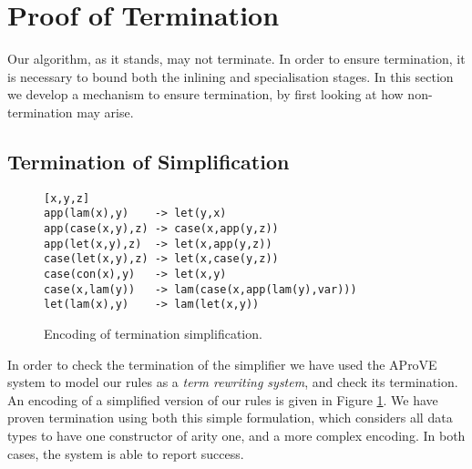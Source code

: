
\section{Proof of Termination}
\label{secF:termination}

\begin{comment}
We can remove all data types by encoding them as functions, as described in \citet{naylor:reduceron}. If we then had a transformation which made the program first-order \textit{without} introducing any data types, we would end up with a program without data or closures, which is incapable of storing an unbounded amount of information. Since with higher-order functions we can implement a Turing machine \cite{turing:halting}, and without an unbounded store we cannot, such a transformation cannot exist.
\end{comment}

Our algorithm, as it stands, may not terminate. In order to ensure termination, it is necessary to bound both the inlining and specialisation stages. In this section we develop a mechanism to ensure termination, by first looking at how non-termination may arise.

\subsection{Termination of Simplification}
\label{secF:termination_simplification}

\begin{figure}
\bigskip
\begin{verbatim}
[x,y,z]
app(lam(x),y)    -> let(y,x)
app(case(x,y),z) -> case(x,app(y,z))
app(let(x,y),z)  -> let(x,app(y,z))
case(let(x,y),z) -> let(x,case(y,z))
case(con(x),y)   -> let(x,y)
case(x,lam(y))   -> lam(case(x,app(lam(y),var)))
let(lam(x),y)    -> lam(let(x,y))
\end{verbatim}
\bigskip
\caption{Encoding of termination simplification.}
\label{figF:term_simplification}
\end{figure}

In order to check the termination of the simplifier we have used the AProVE system \cite{aprove} to model our rules as a \textit{term rewriting system}, and check its termination. An encoding of a simplified version of our rules is given in Figure \ref{figF:term_simplification}. We have proven termination using both this simple formulation, which considers all data types to have one constructor of arity one, and a more complex encoding. In both cases, the system is able to report success.

